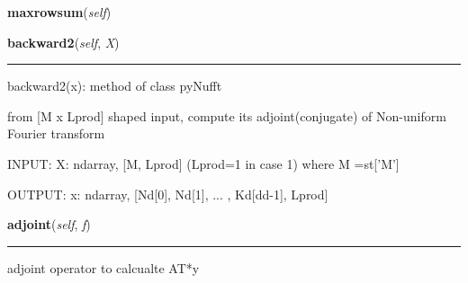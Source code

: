     \label{CsTransform:pynufft:pynufft:maxrowsum}

    \vspace{0.5ex}

\hspace{.8\funcindent}\begin{boxedminipage}{\funcwidth}

    \raggedright \textbf{maxrowsum}(\textit{self})

\setlength{\parskip}{2ex}
\setlength{\parskip}{1ex}
    \end{boxedminipage}

    \label{CsTransform:pynufft:pynufft:backward2}

    \vspace{0.5ex}

\hspace{.8\funcindent}\begin{boxedminipage}{\funcwidth}

    \raggedright \textbf{backward2}(\textit{self}, \textit{X})

    \vspace{-1.5ex}

    \rule{\textwidth}{0.5\fboxrule}
\setlength{\parskip}{2ex}
    backward2(x): method of class pyNufft

    from [M x Lprod] shaped input, compute its adjoint(conjugate) of 
    Non-uniform Fourier transform

    INPUT: X: ndarray, [M, Lprod] (Lprod=1 in case 1) where M =st['M']

    OUTPUT: x: ndarray, [Nd[0], Nd[1], ... , Kd[dd-1], Lprod]

\setlength{\parskip}{1ex}
    \end{boxedminipage}

    \label{CsTransform:pynufft:pynufft:adjoint}

    \vspace{0.5ex}

\hspace{.8\funcindent}\begin{boxedminipage}{\funcwidth}

    \raggedright \textbf{adjoint}(\textit{self}, \textit{f})

    \vspace{-1.5ex}

    \rule{\textwidth}{0.5\fboxrule}
\setlength{\parskip}{2ex}
    adjoint operator to calcualte AT*y

\setlength{\parskip}{1ex}
    \end{boxedminipage}


